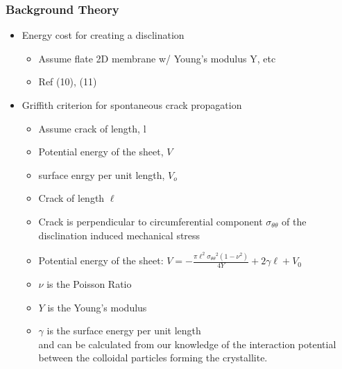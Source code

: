 \documentclass[11pt]{article}
\begin{document}
\subsubsection{Background Theory}
\label{sec-3-1-5}
\begin{itemize}

\item Energy cost for creating a disclination
\label{sec-3-1-5-1}%
\begin{itemize}

\item Assume flate 2D membrane w/ Young's modulus Y, etc\\
\label{sec-3-1-5-1-1}%
\item Ref (10), (11)\\
\label{sec-3-1-5-1-2}%
\end{itemize} %

\item Griffith criterion for spontaneous crack propagation
\label{sec-3-1-5-2}%
\begin{itemize}

\item Assume crack of length, l\\
\label{sec-3-1-5-2-1}%
\item Potential energy of the sheet, $V$\\
\label{sec-3-1-5-2-2}%
\item surface enrgy per unit length, $V_o$\\
\label{sec-3-1-5-2-3}%
\item Crack of length $\ell$\\
\label{sec-3-1-5-2-4}%
\item Crack is perpendicular to circumferential component $\sigma_{\theta \theta}$ of the disclination induced mechanical stress\\
\label{sec-3-1-5-2-5}%
\item Potential energy of the sheet: $V =-\frac{\pi \ell^2 {\sigma_{\theta \theta}}^2 (1-\nu^2)}{4 Y} + 2 \gamma \ell + V_0$\\
\label{sec-3-1-5-2-6}%
\item $\nu$ is the Poisson Ratio\\
\label{sec-3-1-5-2-7}%
\item $Y$ is the Young's modulus\\
\label{sec-3-1-5-2-8}%
\item $\gamma$ is the surface energy per unit length\\
\label{sec-3-1-5-2-9}%
and can be calculated from our knowledge of the interaction potential between the colloidal particles forming the crystallite.


\end{itemize}
\end{itemize}
\end{document}
